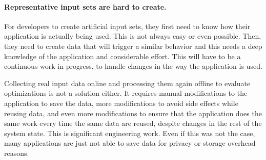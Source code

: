     
    \paragraph{Representative input sets are hard to create.} For developers to create artificial input sets, they first need to know how
    their application is actually being used. This is not always easy or even possible. Then, they need to create data that will trigger a
    similar behavior and this needs a deep knowledge of the application and considerable effort. This will have to be a continuous work in
    progress, to handle changes in the way the application is used.

    Collecting real input data online and processing them again offline to evaluate optimizations is not a solution either. It requires
    manual modifications to the application to save the data, more modifications to avoid side effects while reusing data, and even more
    modifications to ensure that the application does the same work every time the same data are reused, despite changes in the rest of
    the system state. This is significant engineering work. Even if this was not the case, many applications are just not able to save
    data for privacy or storage overhead reasons.
    
